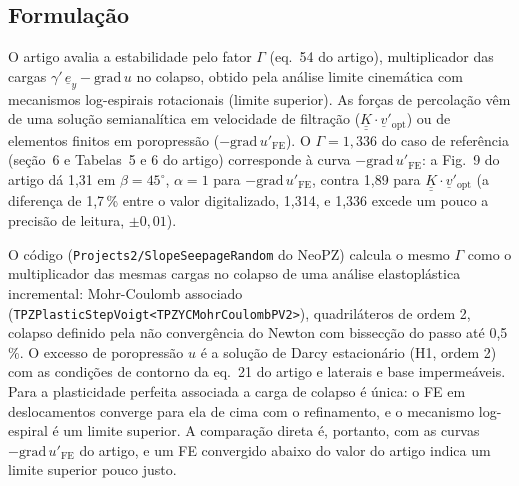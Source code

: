 \documentclass[11pt,a4paper]{article}
\newcommand{\Gam}{\Gamma}
\newcommand{\gradu}{-\mathrm{grad}\,u'_{\mathrm{FE}}}
\newcommand{\vopt}{\underline{\underline{K}}\cdot\underline{v}'_{\mathrm{opt}}}
\begin{document}
\subsection{Formulação}
O artigo avalia a estabilidade pelo fator $\Gam$ (eq.~54 do artigo), multiplicador das cargas $\gamma'\,\underline{e}_y
- \mathrm{grad}\,u$ no colapso, obtido pela análise limite cinemática com mecanismos log-espirais rotacionais (limite
superior). As forças de percolação vêm de uma solução semianalítica em velocidade de filtração ($\vopt$) ou de
elementos finitos em poropressão (${\gradu}$). O $\Gam = 1{,}336$ do caso de referência (seção~6 e Tabelas~5 e 6 do
artigo) corresponde à curva ${\gradu}$: a Fig.~9 do artigo dá 1,31 em $\beta = 45^\circ$, $\alpha = 1$ para
${\gradu}$, contra 1,89 para $\vopt$ (a diferença de 1,7\,\% entre o valor digitalizado, 1,314, e 1,336 excede um
pouco a precisão de leitura, $\pm 0{,}01$).

O código (\texttt{Projects2/SlopeSeepageRandom} do NeoPZ) calcula o mesmo $\Gam$ como o multiplicador das mesmas
cargas no colapso de uma análise elastoplástica incremental: Mohr-Coulomb associado
(\texttt{TPZPlasticStepVoigt<TPZYCMohrCoulombPV2>}), quadriláteros de ordem 2, colapso definido pela não
convergência do Newton com bissecção do passo até 0,5\,\%. O excesso de poropressão $u$ é a solução de Darcy
estacionário (H1, ordem 2) com as condições de contorno da eq.~21 do artigo e laterais e base impermeáveis. Para a
plasticidade perfeita associada a carga de colapso é única: o FE em deslocamentos converge para ela de cima com o
refinamento, e o mecanismo log-espiral é um limite superior. A comparação direta é, portanto, com as curvas ${\gradu}$
do artigo, e um FE convergido abaixo do valor do artigo indica um limite superior pouco justo.
\end{document}
